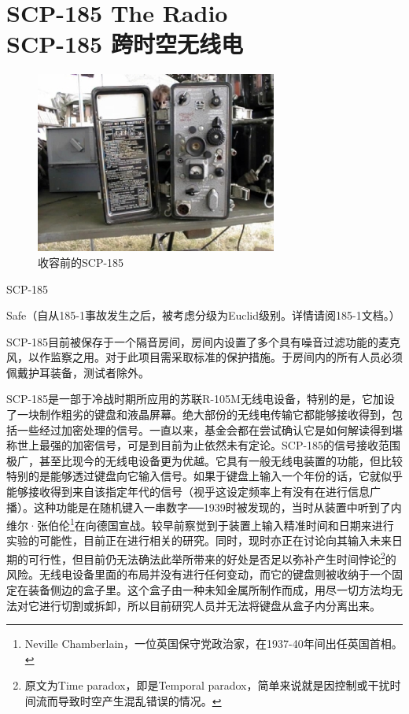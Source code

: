 \chapter[SCP-185 跨时空无线电]{
    SCP-185 The Radio\\
    SCP-185 跨时空无线电
}

\label{chap:SCP-185}

\begin{figure}[H]
    \centering
    \includegraphics[width=0.5\linewidth]{images/SCP-185.jpg}
    \caption*{收容前的SCP-185}
\end{figure}

SCP-185

Safe（自从185-1事故发生之后，被考虑分级为Euclid级别。详情请阅185-1文档。）

SCP-185目前被保存于一个隔音房间，房间内设置了多个具有噪音过滤功能的麦克风，以作监察之用。对于此项目需采取标准的保护措施。于房间内的所有人员必须佩戴护耳装备，测试者除外。

SCP-185是一部于冷战时期所应用的苏联R-105M无线电设备，特别的是，它加设了一块制作粗劣的键盘和液晶屏幕。绝大部份的无线电传输它都能够接收得到，包括一些经过加密处理的信号。一直以来，基金会都在尝试确认它是如何解读得到堪称世上最强的加密信号，可是到目前为止依然未有定论。SCP-185的信号接收范围极广，甚至比现今的无线电设备更为优越。它具有一般无线电装置的功能，但比较特别的是能够透过键盘向它输入信号。如果于键盘上输入一个年份的话，它就似乎能够接收得到来自该指定年代的信号（视乎这设定频率上有没有在进行信息广播）。这种功能是在随机键入一串数字──1939时被发现的，当时从装置中听到了内维尔·张伯伦\footnote{Neville Chamberlain，一位英国保守党政治家，在1937-40年间出任英国首相。}在向德国宣战。较早前察觉到于装置上输入精准时间和日期来进行实验的可能性，目前正在进行相关的研究。同时，现时亦正在讨论向其输入未来日期的可行性，但目前仍无法确法此举所带来的好处是否足以弥补产生时间悖论\footnote{原文为Time paradox，即是Temporal paradox，简单来说就是因控制或干扰时间流而导致时空产生混乱错误的情况。}的风险。无线电设备里面的布局并没有进行任何变动，而它的键盘则被收纳于一个固定在装备侧边的盒子里。这个盒子由一种未知金属所制作而成，用尽一切方法均无法对它进行切割或拆卸，所以目前研究人员并无法将键盘从盒子内分离出来。

